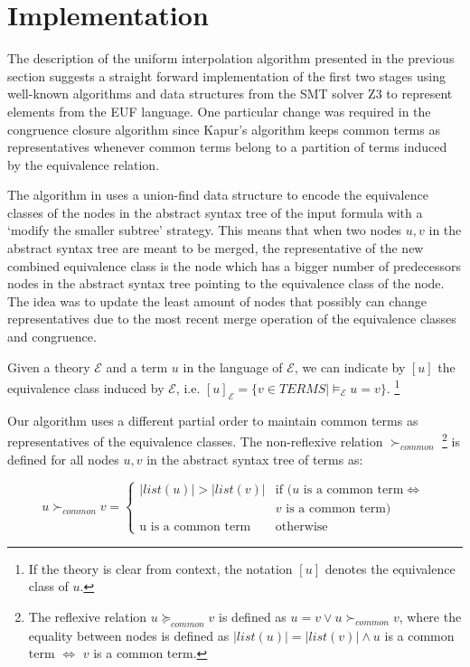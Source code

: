 \section{Implementation}

The description of the uniform interpolation 
algorithm presented in the
previous section suggests a straight forward implementation
of the first two stages using well-known algorithms 
\cite{10.1145/322186.322198,10.1145/322217.322228} 
and data structures from the SMT
solver Z3 \cite{10.1007/978-3-540-78800-3_24} to represent 
elements from the EUF language. One particular change was 
required in the congruence closure algorithm since Kapur's 
algorithm keeps common terms as representatives
whenever common terms belong to a partition of terms induced
by the equivalence relation.

The algorithm in \cite{10.1145/322217.322228}
uses a union-find data structure to encode the equivalence classes
of the nodes in the abstract syntax tree of the input formula with 
a `modify the smaller subtree' strategy. This means that
when two nodes $u, v$ in the abstract syntax tree are
meant to be merged, the representative of the new 
combined equivalence class is the node which has a bigger
number of predecessors nodes in the abstract
syntax tree pointing to the
equivalence class of the node. The idea was to update the least
amount of nodes that possibly can change representatives
due to the most recent merge operation of the equivalence classes 
and congruence.

\begin{notation}
  Given a theory $\mathcal{E}$ and a term $u$ in the language of 
  $\mathcal{E}$, we can indicate by $[u]$ the equivalence class
  induced by $\mathcal{E}$, i.e. $[u]_{\mathcal{E}} = \{ v \in TERMS | 
  \models_{\mathcal{E}} u = v\}$. \footnote{If the theory
    is clear from context, the notation $[u]$
  denotes the equivalence class of $u$.}
\end{notation}

Our algorithm uses a different partial order to 
maintain common terms as representatives of 
the equivalence classes. The non-reflexive relation 
$\succ_{common}$ 
\footnote{The reflexive relation $u \succeq_{common} v$
  is defined as $u = v \lor u \succ_{common} v$, where
  the equality between nodes is defined as $|list(u)| = 
  |list(v)| \land u$ is a common term $\iff$ 
  $v$ is a common term.
}
is defined for all nodes $u, v$ in the abstract syntax 
tree of terms as:

\begin{equation*}
  u \succ_{common} v = \begin{cases} 
    |list(u)| > |list(v)| & \text{if }(u \text{ is a common term}\Leftrightarrow \\ 
    & v \text{ is a common term}) \\
    \text{u is a common term} & \text{otherwise}
  \end{cases}
\end{equation*}

